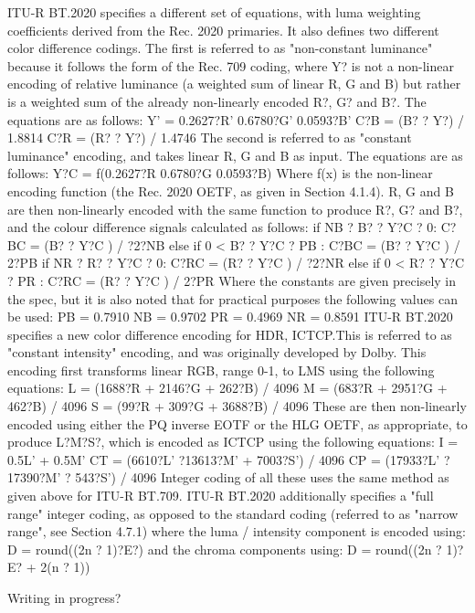 ITU-R BT.2020 specifies a different set of equations, with luma weighting coefficients derived from the Rec. 2020 primaries. It also defines two different color difference codings.
The first is referred to as "non-constant luminance" because it follows the form of the Rec. 709 coding, where Y? is not a non-linear encoding of relative luminance (a weighted sum of linear R, G and B) but rather is a weighted sum of the already non-linearly encoded R?, G? and B?. The equations are as follows:
	Y' = 0.2627?R'  0.6780?G'  0.0593?B'
	C?B = (B? ? Y?) / 1.8814
	C?R = (R? ? Y?) / 1.4746
The second is referred to as "constant luminance" encoding, and takes linear R, G and B as input. The equations are as follows:
	Y?C = f(0.2627?R  0.6780?G  0.0593?B)
Where f(x) is the non-linear encoding function (the Rec. 2020 OETF, as given in Section 4.1.4). R, G and B are then non-linearly encoded with the same function to produce R?, G? and B?, and the colour difference signals calculated as follows:
	if NB ? B? ? Y?C ? 0:
C?BC = (B? ? Y?C ) / ?2?NB
else if 0 < B? ? Y?C ? PB :
	C?BC = (B? ? Y?C ) / 2?PB
	if NR ? R? ? Y?C ? 0:
C?RC = (R? ? Y?C ) / ?2?NR
else if 0 < R? ? Y?C ? PR :
	C?RC = (R? ? Y?C ) / 2?PR
Where the constants are given precisely in the spec, but it is also noted that for practical purposes the following values can be used:
	PB = 0.7910
NB = 0.9702
PR = 0.4969
NR = 0.8591
ITU-R BT.2020 specifies a new color difference encoding for HDR,  ICTCP.This is referred to as "constant intensity" encoding, and was originally developed by Dolby. This encoding first transforms linear RGB, range 0-1, to LMS using the following equations:
	L = (1688?R + 2146?G + 262?B) / 4096
M = (683?R + 2951?G + 462?B) / 4096
S = (99?R + 309?G + 3688?B) / 4096
These are then non-linearly encoded using either the PQ inverse EOTF or the HLG OETF, as appropriate, to produce L?M?S?, which is encoded as  ICTCP using the following equations:
	I = 0.5L' + 0.5M'
	CT = (6610?L' ?13613?M' + 7003?S') / 4096
CP = (17933?L' ? 17390?M' ? 543?S') / 4096
Integer coding of all these uses the same method as given above for ITU-R BT.709. ITU-R BT.2020 additionally specifies a "full range" integer coding, as opposed to the standard coding (referred to as "narrow range", see Section 4.7.1) where the luma / intensity component is encoded using:
	D = round((2n ? 1)?E?)
and the chroma components using:
	D = round((2n ? 1)?E? + 2(n ? 1))


Writing in progress?

